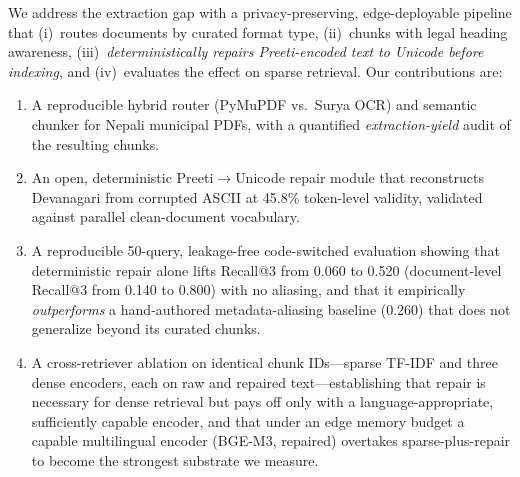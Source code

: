 \documentclass[journal]{IEEEtran}
\newcommand{\nqueries}{50}
\newcommand{\rawRecall}{0.060}
\newcommand{\rawDocRecall}{0.140}
\newcommand{\repRecall}{0.520}
\newcommand{\repDocRecall}{0.800}
\newcommand{\aliRecall}{0.260}
\newcommand{\repairValidity}{45.8}
\begin{document}
We address the extraction gap with a privacy-preserving, edge-deployable pipeline that (i)~routes documents by curated format type, (ii)~chunks with legal heading awareness, (iii)~\emph{deterministically repairs Preeti-encoded text to Unicode before indexing}, and (iv)~evaluates the effect on sparse retrieval. Our contributions are:
\begin{enumerate}
  \item A reproducible hybrid router (PyMuPDF vs.\ Surya OCR) and semantic chunker for Nepali municipal PDFs, with a quantified \emph{extraction-yield} audit of the resulting chunks.
  \item An open, deterministic Preeti$\rightarrow$Unicode repair module that reconstructs Devanagari from corrupted ASCII at \repairValidity{}\% token-level validity, validated against parallel clean-document vocabulary.
  \item A reproducible \nqueries{}-query, leakage-free code-switched evaluation showing that deterministic repair alone lifts Recall@3 from \rawRecall{} to \repRecall{} (document-level Recall@3 from \rawDocRecall{} to \repDocRecall{}) with no aliasing, and that it empirically \emph{outperforms} a hand-authored metadata-aliasing baseline (\aliRecall{}) that does not generalize beyond its curated chunks.
  \item A cross-retriever ablation on identical chunk IDs---sparse TF-IDF and three dense encoders, each on raw and repaired text---establishing that repair is necessary for dense retrieval but pays off only with a language-appropriate, sufficiently capable encoder, and that under an edge memory budget a capable multilingual encoder (BGE-M3, repaired) overtakes sparse-plus-repair to become the strongest substrate we measure.
\end{enumerate}

\end{document}
